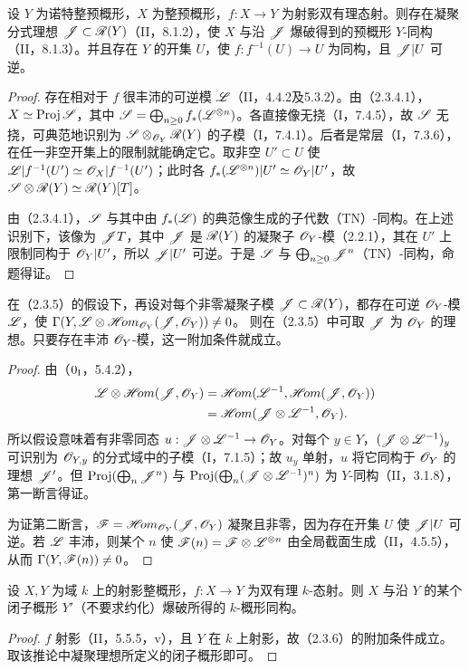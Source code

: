 设 $Y$ 为诺特整预概形，$X$ 为整预概形，$f:X\to Y$ 为射影双有理态射。则存在凝聚分式理想 $\mathscr J\subset\mathscr R(Y)$（II，8.1.2），使 $X$ 与沿 $\mathscr J$ 爆破得到的预概形 $Y$-同构（II，8.1.3）。并且存在 $Y$ 的开集 $U$，使 $f:f^{-1}(U)\to U$ 为同构，且 $\mathscr J|U$ 可逆。
\begin{proof}
存在相对于 $f$ 很丰沛的可逆模 $\mathscr L$（II，4.4.2及5.3.2）。由（2.3.4.1），$X\simeq\operatorname{Proj}\mathscr S$，其中 $\mathscr S=\bigoplus_{n\geq0}f_*(\mathscr L^{\otimes n})$。各直接像无挠（I，7.4.5），故 $\mathscr S$ 无挠，可典范地识别为 $\mathscr S\otimes_{\mathscr O_Y}\mathscr R(Y)$ 的子模（I，7.4.1）。后者是常层（I，7.3.6），在任一非空开集上的限制就能确定它。取非空 $U'\subset U$ 使 $\mathscr L|f^{-1}(U')\simeq\mathscr O_X|f^{-1}(U')$；此时各 $f_*(\mathscr L^{\otimes n})|U'\simeq\mathscr O_Y|U'$，故 $\mathscr S\otimes\mathscr R(Y)\simeq\mathscr R(Y)[T]$。

由（2.3.4.1），$\mathscr S$ 与其中由 $f_*(\mathscr L)$ 的典范像生成的子代数（TN）-同构。在上述识别下，该像为 $\mathscr J T$，其中 $\mathscr J$ 是 $\mathscr R(Y)$ 的凝聚子 $\mathscr O_Y$-模（2.2.1），其在 $U'$ 上限制同构于 $\mathscr O_Y|U'$，所以 $\mathscr J|U'$ 可逆。于是 $\mathscr S$ 与 $\bigoplus_{n\geq0}\mathscr J^n$（TN）-同构，命题得证。
\end{proof}

在（2.3.5）的假设下，再设对每个非零凝聚子模 $\mathscr J\subset\mathscr R(Y)$，都存在可逆 $\mathscr O_Y$-模 $\mathscr L$，使
$\Gamma(Y,\mathscr L\otimes\mathscr{H}\!om_{\mathscr O_Y}(\mathscr J,\mathscr O_Y))\ne0$。
则在（2.3.5）中可取 $\mathscr J$ 为 $\mathscr O_Y$ 的理想。只要存在丰沛 $\mathscr O_Y$-模，这一附加条件就成立。
\begin{proof}
由（$0_{\mathrm I}$，5.4.2），
\[
\begin{aligned}
\mathscr L\otimes\mathscr{H}\!om(\mathscr J,\mathscr O_Y)
&=\mathscr{H}\!om(\mathscr L^{-1},\mathscr{H}\!om(\mathscr J,\mathscr O_Y))\\
&=\mathscr{H}\!om(\mathscr J\otimes\mathscr L^{-1},\mathscr O_Y).
\end{aligned}
\]
所以假设意味着有非零同态 $u:\mathscr J\otimes\mathscr L^{-1}\to\mathscr O_Y$。对每个 $y\in Y$，$(\mathscr J\otimes\mathscr L^{-1})_y$ 可识别为 $\mathscr O_{Y,y}$ 的分式域中的子模（I，7.1.5）；故 $u_y$ 单射，$u$ 将它同构于 $\mathscr O_Y$ 的理想 $\mathscr J'$。但 $\operatorname{Proj}(\bigoplus_n\mathscr J^n)$ 与 $\operatorname{Proj}(\bigoplus_n(\mathscr J\otimes\mathscr L^{-1})^n)$ 为 $Y$-同构（II，3.1.8），第一断言得证。

为证第二断言，$\mathscr F=\mathscr{H}\!om_{\mathscr O_Y}(\mathscr J,\mathscr O_Y)$ 凝聚且非零，因为存在开集 $U$ 使 $\mathscr J|U$ 可逆。若 $\mathscr L$ 丰沛，则某个 $n$ 使 $\mathscr F(n)=\mathscr F\otimes\mathscr L^{\otimes n}$ 由全局截面生成（II，4.5.5），从而 $\Gamma(Y,\mathscr F(n))\ne0$。
\end{proof}

设 $X,Y$ 为域 $k$ 上的射影整概形，$f:X\to Y$ 为双有理 $k$-态射。则 $X$ 与沿 $Y$ 的某个闭子概形 $Y'$（不要求约化）爆破所得的 $k$-概形同构。
\begin{proof}
$f$ 射影（II，5.5.5，v），且 $Y$ 在 $k$ 上射影，故（2.3.6）的附加条件成立。取该推论中凝聚理想所定义的闭子概形即可。
\end{proof}

